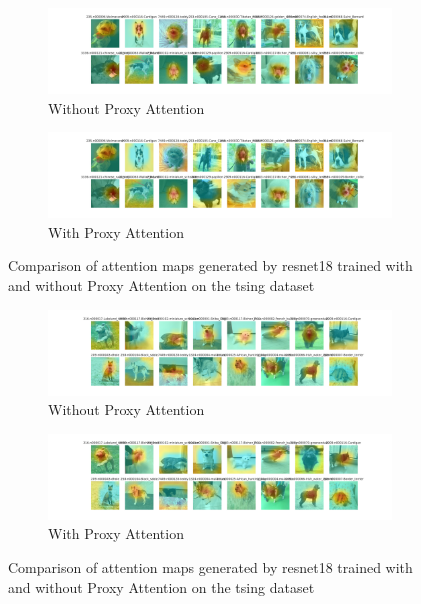 
    \begin{figure}[H]
        \centering
        \begin{subfigure}[b]{1\textwidth}
            \includegraphics[width=\textwidth]{images/tsing_resnet18_noproxy_0.pdf}
            \caption{Without Proxy Attention}
        \end{subfigure}
        \hfill
        \begin{subfigure}[b]{1\textwidth}
            \includegraphics[width=\textwidth]{images/tsing_resnet18_proxy_0.pdf}
            \caption{With Proxy Attention}
        \end{subfigure}
        \caption{Comparison of attention maps generated by resnet18 trained with and without Proxy Attention on the tsing dataset}
    \end{figure}
    

    \begin{figure}[H]
        \centering
        \begin{subfigure}[b]{1\textwidth}
            \includegraphics[width=\textwidth]{images/tsing_resnet18_noproxy_1.pdf}
            \caption{Without Proxy Attention}
        \end{subfigure}
        \hfill
        \begin{subfigure}[b]{1\textwidth}
            \includegraphics[width=\textwidth]{images/tsing_resnet18_proxy_1.pdf}
            \caption{With Proxy Attention}
        \end{subfigure}
        \caption{Comparison of attention maps generated by resnet18 trained with and without Proxy Attention on the tsing dataset}
    \end{figure}
    


